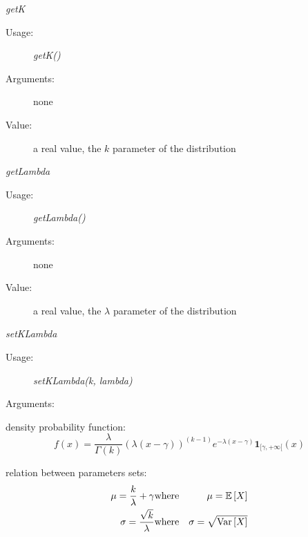 \begin{description}
\begin{description}
\item \textit{getK}
\begin{description}
\item[Usage:] \textit{getK()}
\item[Arguments:] none
\item[Value:]  a real value, the $k$ parameter of the  distribution
\end{description}
\bigskip

\item \textit{getLambda}
\begin{description}
\item[Usage:] \textit{getLambda()}
\item[Arguments:] none
\item[Value:]  a real value, the $\lambda$ parameter of the  distribution
\end{description}
\bigskip


\item \textit{setKLambda}
\begin{description}
\item[Usage:] \textit{setKLambda(k, lambda)}
\item[Arguments:]
\end{description}

\end{description}

\item[Details:]  \rule{0pt}{1em}
\begin{description}
\item density probability function:
\begin{equation}
f(x) = \frac{\lambda}{\Gamma(k)}(\lambda(x-\gamma))^{(k-1)}
e^{-\lambda(x-\gamma)}\boldsymbol{1}_{[\gamma,+\infty[}(x)
\end{equation}
\item relation between parameters sets:
\begin{eqnarray*}
\mu  =   \frac{k}{\lambda}+\gamma                                                 &  \mbox{where}& \mu ={\mathbb E}\left[ X \right] \\
\sigma  = \frac{\sqrt{k}}{\lambda}                &  \mbox{where}& \sigma =\sqrt{{\rm Var}\left[ X \right] }
\end{eqnarray*}

\end{description}

\item[Links:]  \rule{0pt}{1em}
\end{description}

